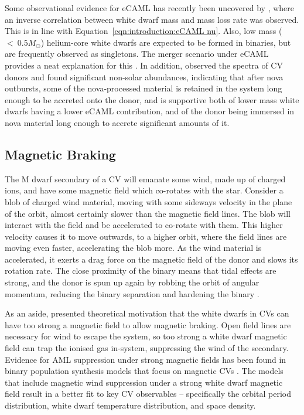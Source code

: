 Some observational evidence for eCAML has recently been uncovered by \citet{Pala2021}, where an inverse correlation between white dwarf mass and mass loss rate was observed. This is in line with Equation~\ref{eqn:introduction:eCAML nu}. 
Also, low mass ($<~0.5M_\odot$) helium-core white dwarfs are expected to be formed in binaries, but are frequently observed as singletons. The merger scenario under eCAML provides a neat explanation for this \citep{zorotovic2017}.
In addition, \citet{sparks2021} observed the spectra of CV donors and found significant non-solar abundances,  indicating that after nova outbursts, some of the nova-processed material is retained in the system long enough to be accreted onto the donor, and is supportive both of lower mass white dwarfs having a lower eCAML contribution, and of the donor being immersed in nova material long enough to accrete significant amounts of it. 


\subsection{Magnetic Braking}
\label{sect:introduction:magnetic braking}

The M dwarf secondary of a CV will emanate some wind, made up of charged ions, and have some magnetic field which co-rotates with the star.
Consider a blob of charged wind material, moving with some sideways velocity in the plane of the orbit, almost certainly slower than the magnetic field lines. 
The blob will interact with the field and be accelerated to co-rotate with them.
This higher velocity causes it to move outwards, to a higher orbit, where the field lines are moving even faster, accelerating the blob more. 
As the wind material is accelerated, it exerts a drag force on the magnetic field of the donor and slows its rotation rate.
The close proximity of the binary means that tidal effects are strong, and the donor is spun up again by robbing the orbit of angular momentum, reducing the binary separation and hardening the binary \citep{verbunt1981}.

As an aside, \citet{wickramasinghe1996} presented theoretical motivation that the white dwarfs in CVs can have too strong a magnetic field to allow magnetic braking. Open field lines are necessary for wind to escape the system, so too strong a white dwarf magnetic field can trap the ionised gas in-system, suppressing the wind of the secondary. 
Evidence for AML suppression under strong magnetic fields has been found in binary population synthesis models that focus on magnetic CVs \citep{belloni2020}. The models that include magnetic wind suppression under a strong white dwarf magnetic field result in a better fit to key CV observables -- specifically the orbital period distribution, white dwarf temperature distribution, and space density.

